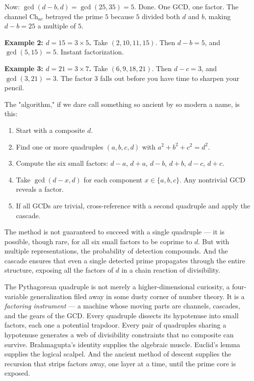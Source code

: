 \documentclass[11pt,twoside,openright]{book}
\theoremstyle{definition}
\theoremstyle{remark}
\begin{document}
Now: $\gcd(d - b, d) = \gcd(25, 35) = 5$. Done. One GCD, one factor. The channel $\mathrm{Ch}_{ac}$ betrayed the prime $5$ because $5$ divided both $d$ and $b$, making $d - b = 25$ a multiple of $5$.

\textbf{Example 2: $d = 15 = 3 \times 5$.} Take $(2, 10, 11, 15)$. Then $d - b = 5$, and $\gcd(5, 15) = 5$. Instant factorization.

\textbf{Example 3: $d = 21 = 3 \times 7$.} Take $(6, 9, 18, 21)$. Then $d - c = 3$, and $\gcd(3, 21) = 3$. The factor $3$ falls out before you have time to sharpen your pencil.

The "algorithm," if we dare call something so ancient by so modern a name, is this:

\begin{enumerate}
  \item Start with a composite $d$.
  \item Find one or more quadruples $(a, b, c, d)$ with $a^2 + b^2 + c^2 = d^2$.
  \item Compute the six small factors: $d - a$, $d + a$, $d - b$, $d + b$, $d - c$, $d + c$.
  \item Take $\gcd(d - x, d)$ for each component $x \in \{a, b, c\}$. Any nontrivial GCD reveals a factor.
  \item If all GCDs are trivial, cross-reference with a second quadruple and apply the cascade.
\end{enumerate}

The method is not guaranteed to succeed with a single quadruple --- it is possible, though rare, for all six small factors to be coprime to $d$. But with multiple representations, the probability of detection compounds. And the cascade ensures that even a single detected prime propagates through the entire structure, exposing all the factors of $d$ in a chain reaction of divisibility.



The Pythagorean quadruple is not merely a higher-dimensional curiosity, a four-variable generalization filed away in some dusty corner of number theory. It is a \textit{factoring instrument} --- a machine whose moving parts are channels, cascades, and the gears of the GCD. Every quadruple dissects its hypotenuse into small factors, each one a potential trapdoor. Every pair of quadruples sharing a hypotenuse generates a web of divisibility constraints that no composite can survive. Brahmagupta's identity supplies the algebraic muscle. Euclid's lemma supplies the logical scalpel. And the ancient method of descent supplies the recursion that strips factors away, one layer at a time, until the prime core is exposed.
\end{document}
